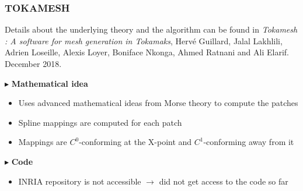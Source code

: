 \documentclass[t,10pt,a3paper]{beamer} %
\begin{document}
\begin{frame} %
\frametitle{\color{vert}\textbf{TOKAMESH}}
\footnotesize	

\vspace*{0.25cm}
Details about the underlying theory and the algorithm can be found in 
\textit{Tokamesh : A software for mesh generation in Tokamaks}, 
Hervé Guillard, Jalal Lakhlili, Adrien Loseille, Alexis Loyer, Boniface Nkonga, Ahmed Ratnani and Ali Elarif. December 2018. 
\vspace*{0.5 cm}

{\color{vert}$\blacktriangleright$ }
\textbf{Mathematical idea}
\begin{itemize}
	\item Uses advanced mathematical ideas from Morse theory to compute the patches
	\item Spline mappings are computed for each patch
	\item Mappings are $C^0$-conforming at the X-point and $C^1$-conforming away from it
\end{itemize}

{\color{vert}$\blacktriangleright$ }
\textbf{Code}

\begin{itemize}
	\item INRIA repository is not accessible $\rightarrow$ did not get access to the code so far
\end{itemize}

\end{frame}
\end{document}
